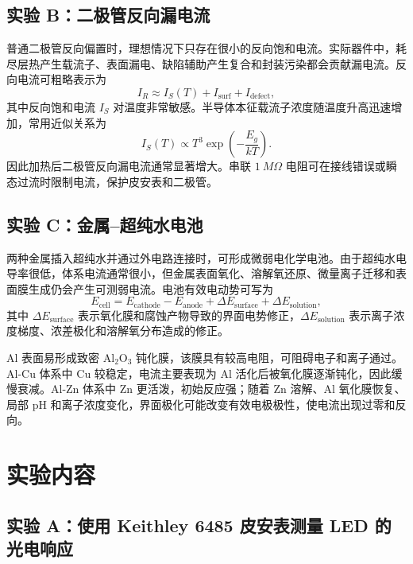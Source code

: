 \documentclass[11pt]{article}
\begin{document}
\subsection{实验 B：二极管反向漏电流}

普通二极管反向偏置时，理想情况下只存在很小的反向饱和电流。实际器件中，耗尽层热产生载流子、表面漏电、缺陷辅助产生复合和封装污染都会贡献漏电流。反向电流可粗略表示为
\begin{equation}
    I_R \approx I_S(T)+I_{\mathrm{surf}}+I_{\mathrm{defect}},
\end{equation}
其中反向饱和电流 $I_S$ 对温度非常敏感。半导体本征载流子浓度随温度升高迅速增加，常用近似关系为
\begin{equation}
    I_S(T)\propto T^3\exp\left(-\frac{E_g}{kT}\right).
\end{equation}
因此加热后二极管反向漏电流通常显著增大。串联 $\SI{1}{M\Omega}$ 电阻可在接线错误或瞬态过流时限制电流，保护皮安表和二极管。

\subsection{实验 C：金属--超纯水电池}

两种金属插入超纯水并通过外电路连接时，可形成微弱电化学电池。由于超纯水电导率很低，体系电流通常很小，但金属表面氧化、溶解氧还原、微量离子迁移和表面膜生成仍会产生可测弱电流。电池有效电动势可写为
\begin{equation}
    E_{\mathrm{cell}}=E_{\mathrm{cathode}}-E_{\mathrm{anode}}+\Delta E_{\mathrm{surface}}+\Delta E_{\mathrm{solution}},
\end{equation}
其中 $\Delta E_{\mathrm{surface}}$ 表示氧化膜和腐蚀产物导致的界面电势修正，$\Delta E_{\mathrm{solution}}$ 表示离子浓度梯度、浓差极化和溶解氧分布造成的修正。

Al 表面易形成致密 $\mathrm{Al_2O_3}$ 钝化膜，该膜具有较高电阻，可阻碍电子和离子通过。Al-Cu 体系中 Cu 较稳定，电流主要表现为 Al 活化后被氧化膜逐渐钝化，因此缓慢衰减。Al-Zn 体系中 Zn 更活泼，初始反应强；随着 Zn 溶解、Al 氧化膜恢复、局部 pH 和离子浓度变化，界面极化可能改变有效电极极性，使电流出现过零和反向。

\section{实验内容}

\subsection{实验 A：使用 Keithley 6485 皮安表测量 LED 的光电响应}
\end{document}
